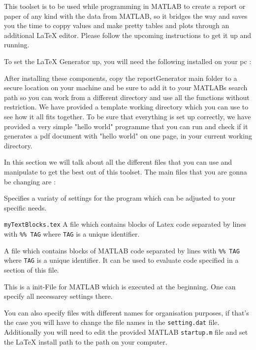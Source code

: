 
This toolset is to be used while programming in MATLAB to create a report or paper of any
kind with the data from MATLAB, so it bridges the way and saves you the time to coppy
values and make pretty tables and plots through an additional LaTeX editor. Please follow the
upcoming instructions to get it up and running.


To set the LaTeX Generator up, you will need the following installed on your pc :


After installing these components, copy the reportGenerator main folder to a secure location
on your machine and be sure to add it to your MATLABs search path so you can work from
a different directory and use all the functions without restriction. We have provided a template
working directory which you can use to see how it all fits together. To be sure that everything
is set up correctly, we have provided a very simple "hello world" programme that you can run
and check if it generates a pdf document with "hello world" on one page, in your current working
directory.


In this section we will talk about all the different files that you can use and manipulate to 
get the best out of this toolset. The main files that you are gonna be changing are :

\begin{description}
\item[{\tt setting.dat}] Specifies a variaty of settings for the program which can be adjusted 
to your specific needs.
\item{{\tt myTextBlocks.tex}} A file which contains blocks of Latex code 
separated by lines with {\tt \%\% TAG} where {\tt TAG} is a unique identifier.
\item[{\tt myCodeBlocks.m}] A file which contains blocks of MATLAB code 
separated by lines with {\tt \%\% TAG} where {\tt TAG} is a unique identifier.
It can be used to evaluate code specified in a section of this file.
\item[{\tt myMatlabInit.m}] This is a init-File for MATLAB which is executed 
at the beginning. One can specify all necessarey settings there.
\end{description}

You can also specify files with different names for organisation purposes, if that's the case
you will have to change the file names in the {\tt setting.dat} file.
Additionally you will need to edit the provided MATLAB {\tt startup.m} file and set the \LaTeX{} 
install path to the path on your computer.



